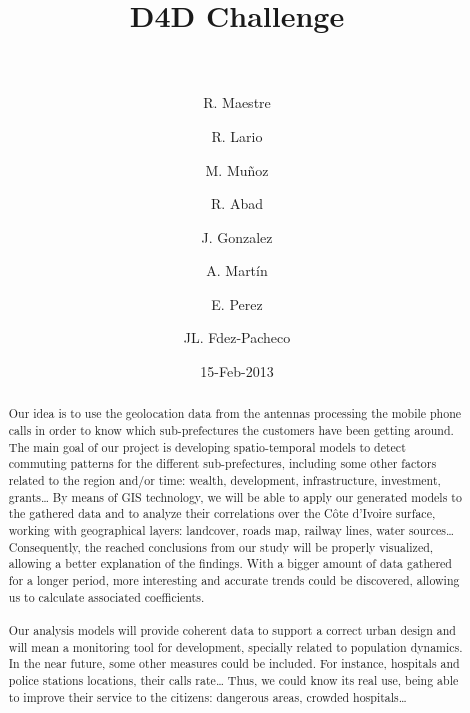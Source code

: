 \documentclass[a4paper,11pt]{article}
\begin{document}
\title{{\huge D4D Challenge} \\  \\ }

\author[1]{R. Maestre}
\author[1]{R. Lario}
\author[1]{M. Muñoz }
\author[1]{R. Abad}
\author[1]{J. Gonzalez}
\author[1]{A. Martín}

\author[2]{E. Perez}

\author[3]{JL. Fdez-Pacheco}



\date{15-Feb-2013}
\maketitle

\begin{abstract} 
Our idea is to use the geolocation data from the antennas processing the mobile phone calls in order to know which sub-prefectures the customers have been getting around. The main goal of our project is developing spatio-temporal models to detect commuting patterns for the different sub-prefectures, including some other factors related to the region and/or time: wealth, development, infrastructure, investment, grants…
By means of GIS technology, we will be able to apply our generated models to the gathered data and to analyze their correlations over the Côte d’Ivoire surface, working with geographical layers: landcover, roads map, railway lines, water sources… Consequently, the reached conclusions from our study will be properly visualized, allowing a better explanation of the findings. With a bigger amount of data gathered for a longer period, more interesting and accurate trends could be discovered, allowing us to calculate associated coefficients.
\\
\\
Our analysis models will provide coherent data to support a correct urban design and will mean a monitoring tool for development, specially related to population dynamics.
In the near future, some other measures could be included. For instance, hospitals and police stations locations, their calls rate… Thus, we could know its real use, being able to improve their service to the citizens: dangerous areas, crowded hospitals…
\\
\\
\end{abstract}
\end{document}

